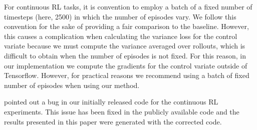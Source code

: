 \documentclass{article}
\begin{document}
For continuous RL tasks, it is convention to employ a batch of a fixed number of timesteps (here, 2500) in which the number of episodes vary. We follow this convention for the sake of providing a fair comparison to the baseline. However, this causes a complication when calculating the variance loss for the control variate because we must compute the variance averaged over rollouts, which is difficult to obtain when the number of episodes is not fixed. For this reason, in our implementation we compute the gradients for the control variate outside of Tensorflow. However, for practical reasons we recommend using a batch of fixed number of episodes when using our method.

\citet{tucker2018mirage} pointed out a bug in our initially released code for the continuous RL experiments. This issue has been fixed in the publicly available code and the results presented in this paper were generated with the corrected code. 
\end{document}
